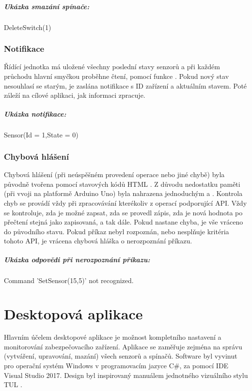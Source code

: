\documentclass[FM,DP]{tulthesis}  %
\begin{document}
\paragraph{Ukázka smazání spínače:}
\begin{center}
DeleteSwitch(1)
\end{center}

\subsection{Notifikace}
Řídící jednotka má uložené všechny poslední stavy senzorů a při každém průchodu hlavní smyčkou proběhne čtení, pomocí funkce . Pokud nový stav nesouhlasí se starým, je zaslána notifikace s ID zařízení a aktuálním stavem. Poté záleží na cílové aplikaci, jak informaci zpracuje.

\paragraph{Ukázka notifikace:}
\begin{center}
Sensor(Id = 1,State = 0)
\end{center} 

\subsection{Chybová hlášení}
Chybová hlášení (při neúspěšném provedení operace nebo jiné chybě) byla původně tvořena pomocí stavových kódů HTML \cite{HTML1.1}. Z důvodu nedostatku paměti (při vvoji na platformě Arduino Uno) byla nahrazena jednoduchým  a . Kontrola chyb se provádí vždy při zpracovávání kterékoliv z operací podporující API. Vždy se kontroluje, zda je možné zapsat, zda se provedl zápis, zda je nová hodnota po přečtení stejná jako zapisovaná, a tak dále. Pokud nastane chyba, je vše vráceno do původního stavu. Pokud příkaz nebyl rozpoznán, nebo nesplňuje kritéria tohoto API, je vrácena chybová hláška o nerozpoznání příkazu.
\paragraph{Ukázka odpovědi při nerozpoznání příkazu:}
\begin{center}
Command 'SetSensor(15,5)' not recognized.
\end{center} 


\chapter{Desktopová aplikace}
Hlavním účelem desktopové aplikace je možnost kompletního nastavení a monitorování zabezpečovacího zařízení. Aplikace se zaměřuje zejména na správu (vytváření, upravování, mazání) všech senzorů a spínačů. Software byl vyvinut pro operační systém Windows v programovacím jazyce C\#, za pomocí IDE Visual Studio 2017. Design byl inspirovaný manuálem jednotného vizuálního stylu TUL \cite{TULVisual}.
\end{document}
